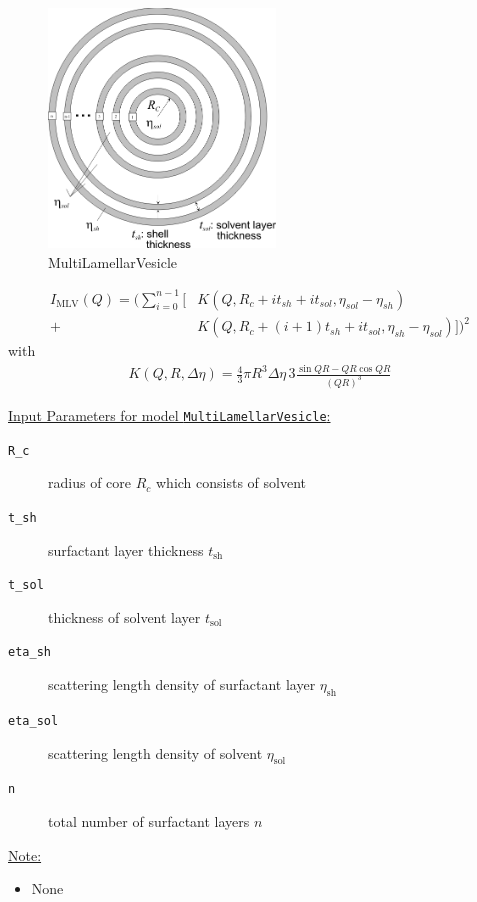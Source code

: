 \begin{figure}[htb]
\begin{center}
\includegraphics[width=0.537\textwidth,height=0.566\textwidth]{../images/form_factor/spheres/multilamellar_vesicle.png}
\end{center}
\caption{MultiLamellarVesicle} \label{fig:MultiLamellarVesicle}
\end{figure}
\begin{align}
I_\text{MLV}(Q) = \Bigg( \sum_{i=0}^{n-1} \bigg[ & K(Q,R_c+it_{sh}+it_{sol},\eta_{sol}-\eta_{sh}) \nonumber \\
+ &K(Q,R_c+(i+1)t_{sh}+it_{sol},\eta_{sh}-\eta_{sol}) \bigg]
\Bigg)^2
\end{align}
with
\begin{align}
 K(Q,R,\Delta\eta) = \frac{4}{3}\pi R^3 \Delta\eta \, 3 \frac{\sin QR - QR \cos QR}{(QR)^3}
\end{align}


\noindent\underline{Input Parameters for model \texttt{MultiLamellarVesicle}:}
\begin{description}
\item[\texttt{R\_c}] radius of core $R_c$ which consists of solvent
\item[\texttt{t\_sh}] surfactant layer thickness $t_\text{sh}$
\item[\texttt{t\_sol}] thickness of solvent layer $t_\text{sol}$
\item[\texttt{eta\_sh}] scattering length density of surfactant layer $\eta_\text{sh}$
\item[\texttt{eta\_sol}] scattering length density of solvent $\eta_\text{sol}$
\item[\texttt{n}] total number of surfactant layers $n$
\end{description}

\noindent\underline{Note:}
\begin{itemize}
\item[~] None
\end{itemize}



